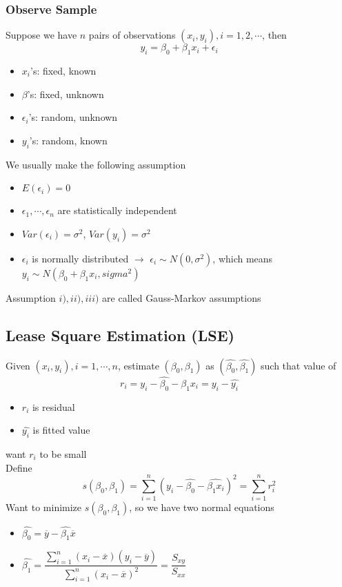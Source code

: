 \documentclass[11pt]{article}
\newcommand{\ds}{\displaystyle}
\begin{document}
\subsubsection{Observe Sample}
Suppose we have $n$ pairs of observations $(x_i,y_i), i=1,2,\cdots$, then 
\[y_i=\beta_0+\beta_1x_i+\epsilon_i\]
\begin{itemize}
    \item $x_i$'s: fixed, known
    \item $\beta$'s: fixed, unknown
    \item $\epsilon_i$'s: random, unknown
    \item $y_i$'s: random, known 
\end{itemize}
We usually make the following assumption
\begin{itemize}
    \item $E(\epsilon_i) = 0$
    \item $\epsilon_1,\cdots,\epsilon_n$ are statistically independent
    \item $Var(\epsilon_i)=\sigma^2$, $Var(y_i)=\sigma^2$
    \item $\epsilon_i$ is normally distributed $\rightarrow$ $\epsilon_i\sim N(0,\sigma^2)$, which means $y_i\sim N(\beta_0+\beta_1x_i, sigma^2)$
\end{itemize}
Assumption $i), ii), iii)$ are called Gauss-Markov assumptions 
\subsection{Lease Square Estimation (LSE)}
Given $(x_i,y_i), i=1,\cdots,n$, estimate $(\beta_0,\beta_1)$ as $(\hat{\beta_0}, \hat{\beta_1})$ such that value of 
\[r_i=y_i-\hat{\beta_0}-\hat{\beta_1}x_i=y_i-\hat{y_i}\]
\begin{itemize}
    \item $r_i$ is residual
    \item $\hat{y_i}$ is fitted value 
\end{itemize}
want $r_i$ to be small \\
Define
\[s(\beta_0,\beta_1)=\sum_{i=1}^{n}(y_i-\hat{\beta_0}-\hat{\beta_1x_i})^2=\sum_{i=1}^{n}r_i^2\]
Want to minimize $s(\beta_0,\beta_1)$, so we have two normal equations
\begin{itemize}
    \item $\hat{\beta_0}=\overline{y}-\hat{\beta_1}\overline{x}$
    \item $\ds\hat{\beta_1} = \dfrac{\ds\sum_{i=1}^{n}(x_i-\overline{x})(y_i-\overline{y})}{\ds\sum_{i=1}^{n}(x_i-\overline{x})^2} = \dfrac{S_{xy}}{S_{xx}}$
\end{itemize}
\end{document}
